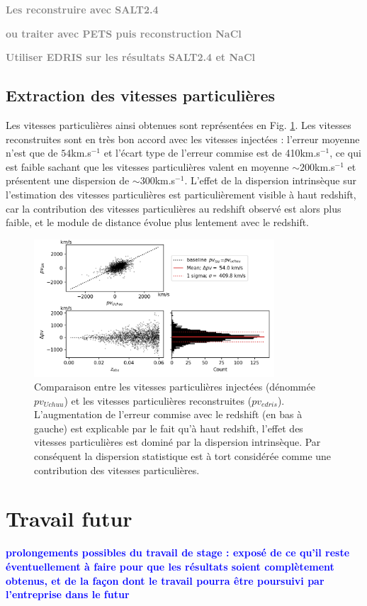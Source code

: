 \documentclass{book}
\newcommand{\todo}[1]{{\textcolor{gray}{\bf \large #1}}}
\newcommand{\consignes}[1]{{\textcolor{blue}{\bf \large #1}}}
\begin{document}
\todo{Les reconstruire avec SALT2.4}

\todo{ou traiter avec PETS puis reconstruction NaCl}

\todo{Utiliser EDRIS sur les résultats SALT2.4 et NaCl}


\section{Extraction des vitesses particulières}

Les vitesses particulières ainsi obtenues sont représentées en Fig. \ref{fig:vp}. Les vitesses reconstruites sont en très bon accord avec les vitesses injectées : l'erreur moyenne n'est que de $54$km.s$^{-1}$ et l'écart type de l'erreur commise est de 410km.s$^{-1}$, ce qui est faible sachant que les vitesses particulières valent en moyenne $\sim 200$km.s$^{-1}$ et présentent une dispersion de $\sim 300$km.s$^{-1}$.   L'effet de la dispersion intrinsèque sur l'estimation des vitesses particulières est particulièrement visible à haut redshift, car la contribution des vitesses particulières au redshift observé est alors plus faible, et le module de distance évolue plus lentement avec le redshift.

\begin{figure}
    \centering
    \includegraphics[width=0.8\textwidth]{figures/edris_vp_uchuu_vs_edris.png}
    \caption{Comparaison entre les vitesses particulières injectées (dénommée $pv_{Uchuu}$) et les vitesses particulières reconstruites ($pv_{edris}$). L'augmentation de l'erreur commise avec le redshift (en bas à gauche) est explicable par le fait qu'à haut redshift, l'effet des vitesses particulières est dominé par la dispersion intrinsèque. Par conséquent la dispersion statistique est à tort considérée comme une contribution des vitesses particulières.}
    \label{fig:vp}
\end{figure}


\chapter{Travail futur}
\consignes{prolongements possibles du travail de stage : exposé de ce qu’il reste éventuellement à faire pour que les résultats soient complètement obtenus, et de la façon dont le travail pourra être poursuivi par l’entreprise dans le futur}
\end{document}
